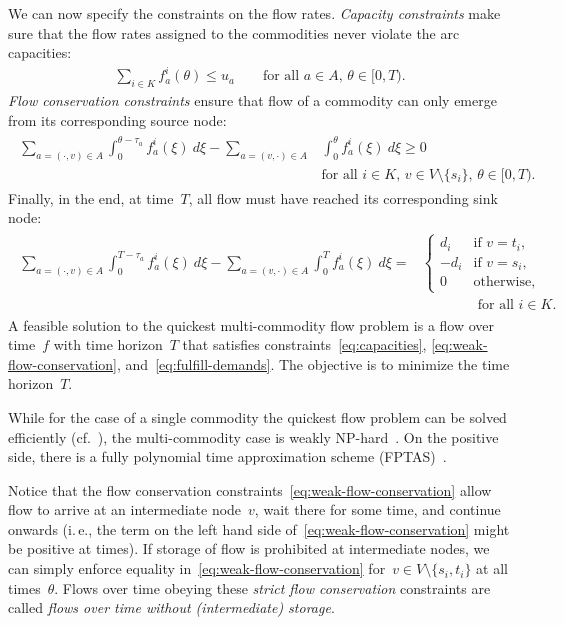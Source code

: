 \documentclass[number]{llncs}
\def\ie{{i.\,e.}}
\begin{document}
We can now specify the constraints on the flow rates. \emph{Capacity constraints} make sure that the flow rates assigned to the commodities never violate the arc capacities:
\begin{align}\label{eq:capacities}
\sum_{i\in K} f^i_a(\theta) \leq u_a\qquad \text{for all $a \in A$, $\theta\in[0,T)$.}
\end{align}
\emph{Flow conservation constraints} ensure that flow of a commodity can only emerge from its corresponding source node:
\begin{align}\label{eq:weak-flow-conservation}
\begin{split}
\sum_{a = (\cdot,v) \in A} \int_0^{\theta-\tau_a} f^i_a(\xi)\ d\xi  - \!\!\!\!\sum_{a = (v,\cdot) \in A} &\int_0^\theta f^i_a(\xi)\ d\xi \geq 0\\
&\text{for all $i\in K$, $v\in V\setminus\{s_i\}$, $\theta\in[0,T)$.}	
\end{split}
\end{align}
Finally, in the end, at time~$T$, all flow must have reached its corresponding sink node:
\begin{align}\label{eq:fulfill-demands}
\begin{split}
\sum_{a = (\cdot,v) \in A} \int_0^{T-\tau_a} f^i_a(\xi)\ d\xi  - \!\!\!\!\sum_{a = (v,\cdot) \in A} \int_0^T f^i_a(\xi)\ d\xi =&
\begin{cases}
d_i & \text{if $v=t_i$,}\\
-d_i & \text{if $v=s_i$,}\\
0 & \text{otherwise,}	
\end{cases}\\
&\qquad\qquad\text{for all $i\in K$.}
\end{split}
\end{align}
A feasible solution to the quickest multi-commodity flow problem is a flow over time~$f$ with time horizon~$T$ that satisfies constraints~\eqref{eq:capacities}, \eqref{eq:weak-flow-conservation}, and~\eqref{eq:fulfill-demands}. The objective is to minimize the time horizon~$T$.

While for the case of a single commodity the quickest flow problem can be solved efficiently (cf.~\cite{FordFulkerson58,BurkardDlaskaKlinz93}), the multi-commodity case is weakly NP-hard~\cite{HallHipplerSkutella07}. On the positive side, there is a fully polynomial time approximation scheme (FPTAS)~\cite{FleischerSkutella02,FleischerSkutella07}.

Notice that the flow conservation constraints~\eqref{eq:weak-flow-conservation} allow flow to arrive at an intermediate node~$v$, wait there for some time, and continue onwards (\ie, the term on the left hand side of~\eqref{eq:weak-flow-conservation} might be positive at times). If storage of flow is prohibited at intermediate nodes, we can simply enforce equality in~\eqref{eq:weak-flow-conservation} for~$v\in V\setminus\{s_i,t_i\}$ at all times~$\theta$. Flows over time obeying these \emph{strict flow conservation} constraints are called \emph{flows over time without (intermediate) storage}. 
\end{document}
